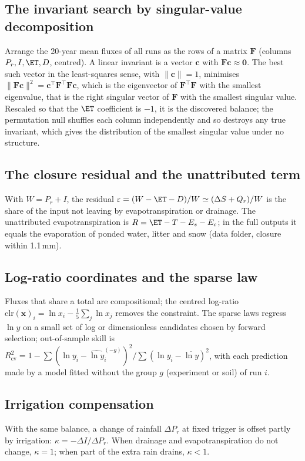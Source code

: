\subsection{The invariant search by singular-value decomposition}
Arrange the 20-year mean fluxes of all runs as the rows of a matrix $\mathbf F$ (columns $P_r,I,\ET,D$, centred). A linear invariant is a vector $\mathbf c$ with $\mathbf F\mathbf c\approx\mathbf 0$. The best such vector in the least-squares sense, with $\|\mathbf c\|=1$, minimises $\|\mathbf F\mathbf c\|^2=\mathbf c^\top\mathbf F^\top\mathbf F\mathbf c$, which is the eigenvector of $\mathbf F^\top\mathbf F$ with the smallest eigenvalue, that is the right singular vector of $\mathbf F$ with the smallest singular value. Rescaled so that the $\ET$ coefficient is $-1$, it is the discovered balance; the permutation null shuffles each column independently and so destroys any true invariant, which gives the distribution of the smallest singular value under no structure.

\subsection{The closure residual and the unattributed term}
With $W=P_r+I$, the residual $\varepsilon=(W-\ET-D)/W\simeq(\Delta S+Q_r)/W$ is the share of the input not leaving by evapotranspiration or drainage. The unattributed evapotranspiration is $R=\ET-T-E_s-E_c$; in the full outputs it equals the evaporation of ponded water, litter and snow (data folder, closure within 1.1\,mm).

\subsection{Log-ratio coordinates and the sparse law}
Fluxes that share a total are compositional; the centred log-ratio $\mathrm{clr}(\mathbf x)_i=\ln x_i-\tfrac15\sum_j\ln x_j$ removes the constraint. The sparse laws regress $\ln y$ on a small set of log or dimensionless candidates chosen by forward selection; out-of-sample skill is $R^2_{\mathrm{cv}}=1-\sum(\ln y_i-\widehat{\ln y}_i^{(-g)})^2/\sum(\ln y_i-\overline{\ln y})^2$, with each prediction made by a model fitted without the group $g$ (experiment or soil) of run $i$.

\subsection{Irrigation compensation}
With the same balance, a change of rainfall $\Delta P_r$ at fixed trigger is offset partly by irrigation: $\kappa=-\Delta I/\Delta P_r$. When drainage and evapotranspiration do not change, $\kappa=1$; when part of the extra rain drains, $\kappa<1$.


